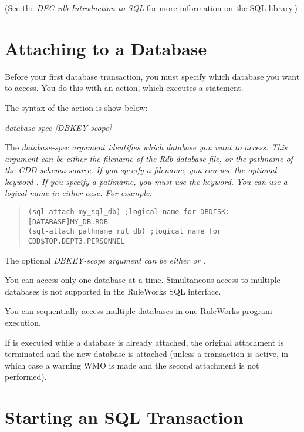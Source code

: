 (See the \emph{DEC rdb Introduction to SQL} for more information on
the SQL library.)

\section{Attaching to a Database}

Before your first database transaction, you must specify which
database you want to access. You do this with an  action,
which executes a  statement.

The syntax of the  action is show below:

 \it{database-spec} [\it{DBKEY-scope}]

The \it{database-spec} argument identifies which database you want to
access. This argument can be either the filename of the Rdb database
file, or the pathname of the CDD schema source. If you specify a
filename, you can use the optional keyword . If you specify a
pathname, you must use the  keyword.  You can use a logical
name in either case. For example:

\begin{quote}
\begin{verbatim}
(sql-attach my_sql_db) ;logical name for DBDISK:[DATABASE]MY_DB.RDB
(sql-attach pathname rul_db) ;logical name for CDD$TOP.DEPT3.PERSONNEL
\end{verbatim}
\end{quote}  

The optional \it{DBKEY-scope} argument can be either 
or .

\begin{note}
  You can access only one database at a time. Simultaneous access to
  multiple databases is not supported in the RuleWorks SQL
  interface.
\end{note}

You can sequentially access multiple databases in one RuleWorks
program execution.

If  is executed while a database is already attached, the
original attachment is terminated and the new database is attached
(unless a transaction is active, in which case a warning WMO is made
and the second attachment is not performed).

\section{Starting an SQL Transaction}

